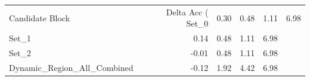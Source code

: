 \begin{tabular}{lrrrr}
\toprule
Candidate Block & Delta Acc (%
\midrule
Set_0 & 0.30 & 0.48 & 1.11 & 6.98 \\
Set_1 & 0.14 & 0.48 & 1.11 & 6.98 \\
Set_2 & -0.01 & 0.48 & 1.11 & 6.98 \\
Dynamic_Region_All_Combined & -0.12 & 1.92 & 4.42 & 6.98 \\
\bottomrule
\end{tabular}
